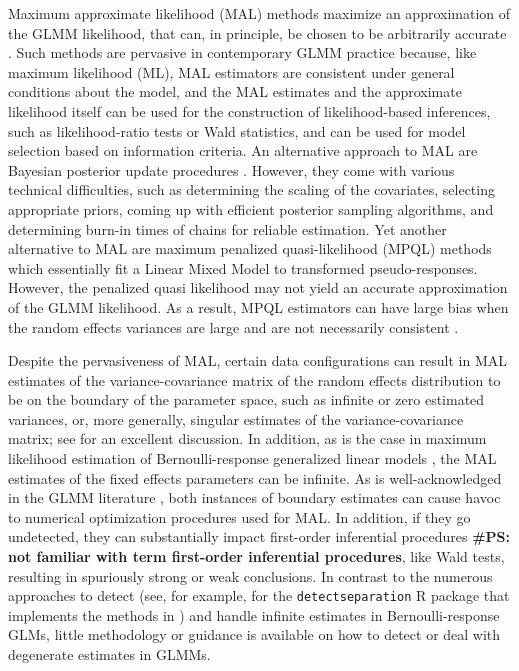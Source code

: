 \documentclass[11pt, a4paper]{article}
\newcommand{\PS}[1]{{\noindent \color{red} \bf \#PS: #1}}
\theoremstyle{example} \newtheorem{example}{Example}[section]
\theoremstyle{theorem} \newtheorem{theorem}{Theorem}[section]
\begin{document}
Maximum approximate likelihood (MAL) methods maximize an 
approximation of the GLMM likelihood, that can, in principle, be
chosen to be arbitrarily accurate \citep[see, for example,
][]{raudenbush+etal:2000, pinheiro+chao:2006}. Such methods are
pervasive in contemporary GLMM practice because, like maximum
likelihood (ML), MAL estimators are consistent under general conditions
about the model, and the MAL estimates and the approximate likelihood
itself can be used for the construction of likelihood-based
inferences, such as likelihood-ratio tests or Wald
statistics, and can be used for model selection based on information criteria. An
alternative approach to MAL are Bayesian posterior update procedures
\citep[see, for example,][]{zhao+etal:2006,browne+draper:2006}. However, they come with
various technical difficulties, such as determining the scaling of the
covariates, selecting appropriate priors, coming up with efficient
posterior sampling algorithms, and determining burn-in times of chains
for reliable estimation. Yet another alternative to MAL are maximum
penalized quasi-likelihood (MPQL) methods \citep{schall:1991,
  wolfinger+oconnel:1993, breslow+clayton:1993} which essentially fit a Linear Mixed Model to transformed pseudo-responses. However, the penalized quasi likelihood may not
yield an accurate approximation of the GLMM likelihood. As a result,
MPQL estimators can have large bias when the random effects
variances are large
\citep{bolker+etal:2009,rodriguez+goldman1995} and are
not necessarily consistent \citep[Chapter 3.1]{jiang:2017}.

Despite the pervasiveness of MAL, certain data configurations can
result in MAL estimates of the variance-covariance matrix of the
random effects distribution to be on the boundary of the parameter
space, such as infinite or zero estimated variances, or, more
generally, singular estimates of the variance-covariance matrix; see
\cite{chung+etal:2013} for an excellent discussion. In
addition, as is the case in maximum likelihood estimation of
Bernoulli-response generalized linear models \citep[GLMs; see, for
example][Chapter 4]{mccullagh+nelder:1989}, the MAL estimates of the
fixed effects parameters can be
infinite. As is well-acknowledged in the GLMM literature \citep[see,
for example][]{bolker+etal:2009, bolker:2018,
  pasch+etal:2013}, both instances of boundary estimates can
cause havoc to numerical optimization procedures used for MAL. In
addition, if they go undetected, they can substantially impact
first-order inferential procedures \PS{not familiar with term first-order inferential procedures}, like Wald tests, resulting in
spuriously strong or weak conclusions. In contrast to the
numerous approaches to detect (see, for example,
\citealt{kosmidis+schumacher:2021} for the \texttt{detectseparation} R
package that implements the methods in \citealt{konis:2017}) and
handle \citep[see, for example,][]{kosmidis+firth:2020,
 heinze+schemper:2002, gelman+etal:2008} infinite
estimates in Bernoulli-response GLMs, little methodology or guidance
is available on how to detect or deal with degenerate estimates in
GLMMs.
\end{document}

